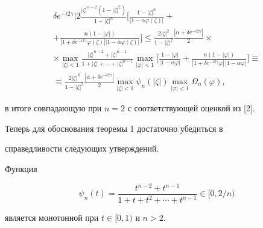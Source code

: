 \begin{multline}
{\delta e^{-i2\gamma}|}2 \frac{{|\zeta|}^{n-2}(1-{|


\zeta|}^2)}{1-{|\zeta|}^n}\bigg[\frac{1-{|\zeta|}


^n}{| 1-\alpha\varphi(\zeta)|}+ \\


%


+\frac{n(1-|\varphi|)}


{| 1+\delta e^{-i2\gamma}\varphi(\zeta)|| 1-


\alpha\varphi(\zeta)|}\bigg]\le


\frac{2{|\zeta|}^2}{1-{|


\zeta|}^2}\frac{|\alpha+\delta e^{-i2\gamma}|}2\times \\


%


\times\max\limits_{|


\zeta|<1}\frac{{|\zeta|}^{n-2}+{|\zeta|}^{n-1}}{1+


|\zeta|+\dotsb+{|\zeta|}^{n-1}}


\max\limits_{{|\varphi|}<1}


\bigg[\frac{1-|\varphi|}{|{1-\alpha\varphi}|}+


\frac{n(1-|


\varphi|)}{|{1+\delta e^{-i2\gamma}\varphi}|\,|{1-\alpha\varphi


|}}\bigg]\equiv \\


%


\equiv\frac{2{|\zeta|}^2}{1-{|\zeta|}^2}\frac{|{\alpha+


\delta e^{-i2\gamma}}|}2 \max\limits_{{|\zeta|}<1} \psi_n(|


\zeta|) \max\limits_{{|\varphi|}<1} \Omega_n(\varphi),


\end{multline}


в итоге совпадающую при $n=2$ с соответствующей оценкой из [2].


Теперь для обоснования теоремы 1 достаточно убедиться в


справедливости следующих утверждений.





\begin{lem}


Функция


$$


\psi_n(t)=\frac{t^{n-2}+t^{n-1}}{1+t+t^2+\dotsb+t^{n-1}}\in [0,2/n)


$$


является монотонной при $t\in [0,1)$ и $n>2$.


\end{lem}





